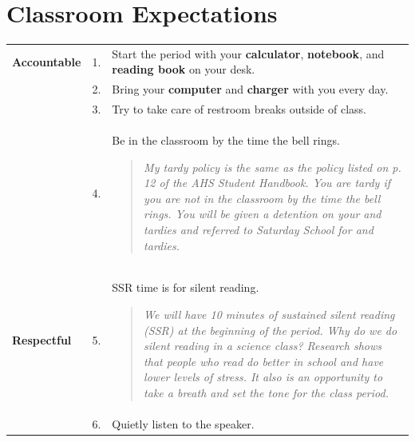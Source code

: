 \documentclass[10pt]{exam}
\newcommand{\mg}{\rowcolor{Goldenrod}}
\begin{document}
\section*{Classroom Expectations}

\begin{center}
  \begin{tabular}
    {
      p{}
      p{}
      p{}
		}
		
    \hline
      \mg \bf Accountable 
      			&  1. & Start the period with your {\bf calculator}, 
                  {\bf notebook}, and {\bf reading book} on your 
                  desk.
      \\
      \mg   &  2. & Bring your {\bf computer} and {\bf charger} with you
                  every day.
      \\
      \mg 	&  3. & Try to take care of restroom breaks 	
									outside of class.
      \\
     	\mg   &  4. & Be in the classroom by the time the bell 
                  rings.
                  \vspace{-1em}
                  \begin{quotation}
                  	\noindent\small
										\textit{My tardy policy is the same as the policy listed on p. 12  of the AHS Student Handbook.  You are tardy if you are not in the classroom by the time the bell rings.  You will be given a detention on your \nth{3} and \nth{4} tardies and referred to Saturday School for \nth{5} and \nth{6} tardies.}
                  \end{quotation}
      \\  
    
    \hline
    \bf Respectful
          &  5. & SSR time is for silent reading.
                 	\vspace{-1em}
                  \begin{quotation}
                  	\noindent\small
										\textit{We will have 10 minutes of sustained silent reading (SSR) 
										at the beginning of the period.  Why do we do silent reading in a 
										science class?  Research shows that people who read do better in 
										school and have lower levels of stress.  It also is an opportunity to 
										take a breath and set the tone for the class period.}
                  \end{quotation}
          \\   
          &  6. & Quietly listen to the speaker.         
          \\  


\end{tabular}
\end{center}
\end{document}
